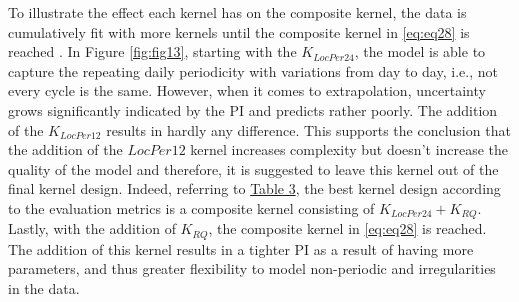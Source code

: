 To illustrate the effect each kernel has on the composite kernel, the data is cumulatively fit with more kernels until the composite kernel in \ref{eq:eq28} is reached \cite{gp_prices}. In Figure \ref{fig:fig13}, starting with the $K_{LocPer24}$, the model is able to capture the repeating daily periodicity with variations from day to day, i.e., not every cycle is the same. However, when it comes to extrapolation, uncertainty grows significantly indicated by the PI and predicts rather poorly. The addition of the $K_{LocPer12}$ results in hardly any difference. This supports the conclusion that the addition of the $LocPer12$ kernel increases complexity but doesn't increase the quality of the model and therefore, it is suggested to leave this kernel out of the final kernel design. Indeed, referring to \hyperlink{table.3}{Table 3}, the best kernel design according to the evaluation metrics is a composite kernel consisting of $K_{LocPer24} + K_{RQ}$. Lastly, with the addition of $K_{RQ}$, the composite kernel in \ref{eq:eq28} is reached. The addition of this kernel results in a tighter PI as a result of having more parameters, and thus greater flexibility to model non-periodic and irregularities in the data.

